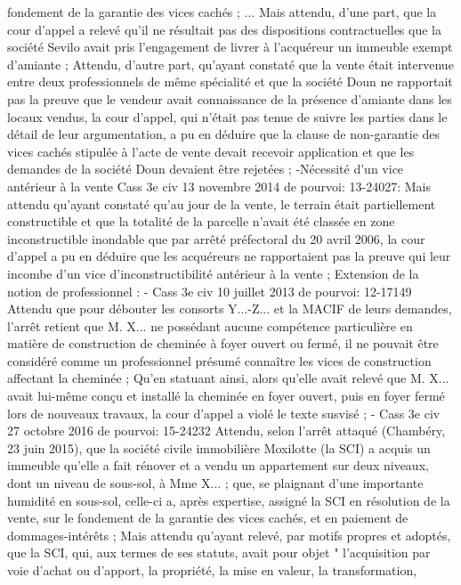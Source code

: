 \documentclass[11pt,a4paper]{report}
\begin{document}
	fondement de la garantie des vices cachés ;
	...
	Mais attendu, d'une part, que la cour d'appel a relevé qu'il ne résultait pas des dispositions contractuelles
	que la société Sevilo avait pris l'engagement de livrer à l'acquéreur un immeuble exempt d'amiante ;
	Attendu, d'autre part, qu'ayant constaté que la vente était intervenue entre deux professionnels de même
	spécialité et que la société Doun ne rapportait pas la preuve que le vendeur avait connaissance de la
	présence d'amiante dans les locaux vendus, la cour d'appel, qui n'était pas tenue de suivre les parties dans
	le détail de leur argumentation, a pu en déduire que la clause de non-garantie des vices cachés stipulée à
	l'acte de vente devait recevoir application et que les demandes de la société Doun devaient être rejetées ;
	-Nécessité d’un vice antérieur à la vente Cass 3e civ 13 novembre 2014 \No  de pourvoi: 13-24027: Mais
	attendu qu'ayant constaté qu'au jour de la vente, le terrain était partiellement constructible et que la totalité
	de la parcelle n'avait été classée en zone inconstructible inondable que par arrêté préfectoral du 20 avril
	2006, la cour d'appel a pu en déduire que les acquéreurs ne rapportaient pas la preuve qui leur incombe
	d'un vice d'inconstructibilité antérieur à la vente ;
	Extension de la notion de professionnel :
	- Cass 3e civ 10 juillet 2013 \No  de pourvoi: 12-17149
	Attendu que pour débouter les consorts Y...-Z... et la MACIF de leurs demandes, l'arrêt retient que M. X...
	ne possédant aucune compétence particulière en matière de construction de cheminée à foyer ouvert ou
	fermé, il ne pouvait être considéré comme un professionnel présumé connaître les vices de construction
	affectant la cheminée ;
	Qu'en statuant ainsi, alors qu'elle avait relevé que M. X... avait lui-même conçu et installé la cheminée en
	foyer ouvert, puis en foyer fermé lors de nouveaux travaux, la cour d'appel a violé le texte susvisé ;
	- Cass 3e civ 27 octobre 2016 \No  de pourvoi: 15-24232
	Attendu, selon l'arrêt attaqué (Chambéry, 23 juin 2015), que la société civile immobilière Moxilotte (la SCI)
	a acquis un immeuble qu'elle a fait rénover et a vendu un appartement sur deux niveaux, dont un niveau de
	sous-sol, à Mme X... ; que, se plaignant d'une importante humidité en sous-sol, celle-ci a, après expertise,
	assigné la SCI en résolution de la vente, sur le fondement de la garantie des vices cachés, et en paiement de
	dommages-intérêts ;
	Mais attendu qu'ayant relevé, par motifs propres et adoptés, que la SCI, qui, aux termes de ses statuts, avait
	pour objet " l'acquisition par voie d'achat ou d'apport, la propriété, la mise en valeur, la transformation,
\end{document}

